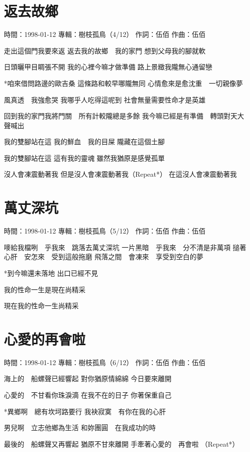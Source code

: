 \documentclass[UTF8,a4paper,oneside,twocolumn,12pt]{ctexbook}
\newcommand{\infopair}[2]{\textbullet #1：#2}
\newcommand{\zc}[1][伍佰]{\infopair{作詞}{#1}}
\newcommand{\zq}[1][伍佰]{\infopair{作曲}{#1}}
\newcommand{\zj}[1]{\infopair{專輯}{#1}}
\newcommand{\sj}[1]{\infopair{時間}{#1}}
\newenvironment{info}{\begin{flushleft}\kaishu
	}
	{\end{flushleft}\normalsize\yahei\par}
\newenvironment{lyric}{
	}
{}
\begin{document}
\section{返去故鄉}
\begin{info}
	\sj{1998-01-12}
	\zj{樹枝孤鳥（4/12）}
	\zc
	\zq
\end{info}
\begin{lyric}
	走出這個門我要來返 返去我的故鄉　我的家門
	想到父母我的腳就軟

	日頭曬甲目睭張不開 我的心裡今嘛才做準備
	路上景緻我隴無心通留戀

	*咱來借問路邊的歐吉桑 這條路和較早哪隴無同
	心情愈來是愈沈重　一切親像夢

	風真透　我強愈哭 我哪乎人吃得這呢到
	社會無量需要性命才是英雄

	回到我的家門我將門關　所有計較隴總是多餘
	我今嘛已經是有準備　轉頭對天大聲喊出

	我的雙腳站在這 我的鮮血　我的目屎
	隴藏在這個土腳

	我的雙腳站在這 這有我的靈魂
	雖然我猶原是感覺孤單

	沒人會凍震動著我
	但是沒人會凍震動著我（Repeat*）
	在這沒人會凍震動著我
\end{lyric}

\section{萬丈深坑}
\begin{info}
	\sj{1998-01-12}
	\zj{樹枝孤鳥（5/12）}
	\zc
	\zq
\end{info}
\begin{lyric}
	嘜給我檔咧　乎我來　跳落去萬丈深坑
	一片黑暗　乎我來　分不清是非萬項
	搥著心肝　安怎來　受到這般拖磨
	飛落之間　會凍來　享受到空白的夢

	*到今嘛還未落地
	出口已經不見

	我的性命一生是現在尚精采

	現在我的性命一生尚精采
\end{lyric}

\section{心愛的再會啦}
\begin{info}
	\sj{1998-01-12}
	\zj{樹枝孤鳥（6/12）}
	\zc
	\zq
\end{info}
\begin{lyric}
	海上的　船螺聲已經響起
	對你猶原情綿綿
	今日要來離開

	心愛的　不甘看你珠淚滴
	在我不在的日子
	你著保重自己

	*異鄉啊　總有坎坷路要行
	我袂寂寞　有你在我的心肝

	男兒啊　立志他鄉為生活
	和妳團圓　在我成功的時

	最後的　船螺聲又再響起
	猶原不甘來離開
	手牽著心愛的　再會啦
	（Repeat*）
\end{lyric}
\end{document}
